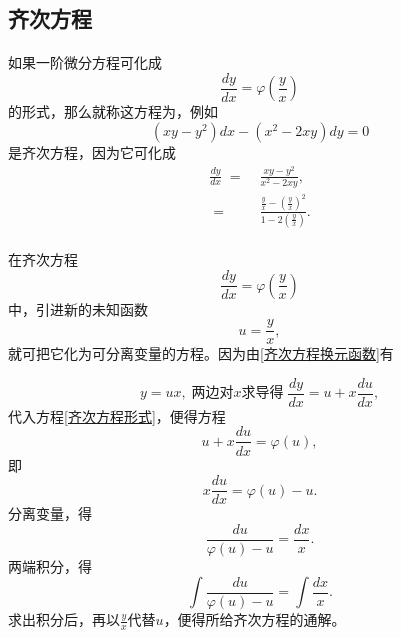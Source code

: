 \subsection{齐次方程}
\paragraph{}
如果一阶微分方程可化成
\begin{equation}
  \label{齐次方程形式}
  \frac{dy}{dx} = \varphi(\frac{y}{x})
\end{equation}
的形式，那么就称这方程为，例如
\begin{equation*}
  (xy-y^2)dx - (x^2-2xy)dy = 0
\end{equation*}
是齐次方程，因为它可化成
\begin{align*}
  \frac{dy}{dx} \;=&\; \frac{xy-y^2}{x^2-2xy}, \\
  \;=&\; \frac{\frac{y}{x} - (\frac{y}{x})^2}{1 - 2(\frac{y}{x})}.
\end{align*}

\paragraph{}
在齐次方程
\begin{equation*}
  \frac{dy}{dx} = \varphi(\frac{y}{x})
\end{equation*}
中，引进新的未知函数
\begin{equation}
  \label{齐次方程换元函数}
  u = \frac{y}{x},
\end{equation}
就可把它化为可分离变量的方程。因为由\eqref{齐次方程换元函数}有

\begin{equation*}
  y = ux, \; \text{两边对$x$求导得} \; \frac{dy}{dx} = u + x\frac{du}{dx},
\end{equation*}
代入方程\eqref{齐次方程形式}，便得方程
\begin{equation*}
  u + x\frac{du}{dx} = \varphi(u),
\end{equation*}
即
\begin{equation*}
    x\frac{du}{dx} = \varphi(u) - u.
\end{equation*}
分离变量，得
\begin{equation*}
  \frac{du}{\varphi(u) - u} = \frac{dx}{x}.
\end{equation*}
两端积分，得
\begin{equation*}
  \int\frac{du}{\varphi(u) - u} = \int\frac{dx}{x}.
\end{equation*}
求出积分后，再以$\displaystyle \frac{y}{x}$代替$u$，便得所给齐次方程的通解。

